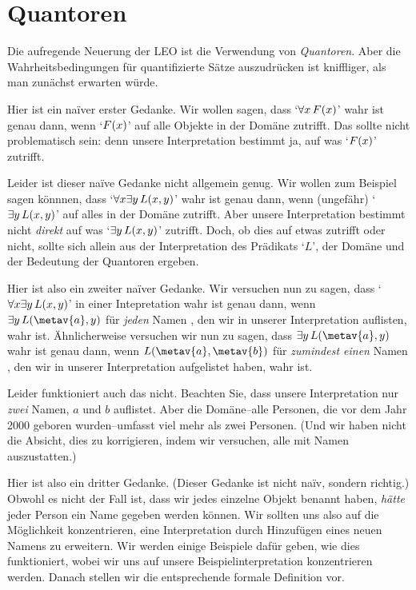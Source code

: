 \section{Quantoren}\label{s:MainLogicalOperatorQuantifier}
Die aufregende Neuerung der LEO ist die Verwendung von \emph{Quantoren}. Aber die Wahrheitsbedingungen für quantifizierte Sätze auszudrücken ist kniffliger, als man zunächst erwarten würde. 

Hier ist ein na\"{i}ver erster Gedanke. Wir wollen sagen, dass `$\forall x\, \mathord{F}(x)$' wahr ist genau dann, wenn `$\mathord{F}(x)$' auf alle Objekte in der Domäne zutrifft. Das sollte nicht problematisch sein: denn unsere Interpretation bestimmt ja, auf was `$\mathord{F}(x)$' zutrifft. 

Leider ist dieser na\"{i}ve Gedanke nicht allgemein genug. Wir wollen zum Beispiel sagen könnnen, dass `$\forall x \exists y\, \mathord{L}(x,y)$' wahr ist genau dann, wenn (ungefähr) `$\exists y\, \mathord{L}(x,y)$' auf alles in der Domäne zutrifft. Aber unsere Interpretation bestimmt nicht \emph{direkt} auf was `$\exists y\, \mathord{L}(x,y)$' zutrifft. Doch, ob dies auf etwas zutrifft oder nicht, sollte sich allein aus der Interpretation des Prädikats `$L$', der Domäne und der Bedeutung der Quantoren ergeben.

Hier ist also ein zweiter na\"{i}ver Gedanke. Wir versuchen nun zu sagen, dass `$\forall x \exists y\, \mathord{L}(x,y)$' in einer Intepretation wahr ist genau dann, wenn $\exists y\, \atom{L}{\metav{a},y}$ für \emph{jeden} Namen , den wir in unserer Interpretation auflisten, wahr ist. Ähnlicherweise versuchen wir nun zu sagen, dass $\exists y\, \atom{L}{\metav{a},y}$ wahr ist genau dann, wenn $\atom{L}{\metav{a},\metav{b}}$ für \emph{zumindest einen} Namen , den wir in unserer Interpretation aufgelistet haben, wahr ist.

Leider funktioniert auch das nicht. Beachten Sie, dass unsere Interpretation nur \emph{zwei} Namen, $a$ und $b$ auflistet. Aber die Domäne--alle Personen, die vor dem Jahr 2000 geboren wurden--umfasst viel mehr als zwei Personen. (Und wir haben nicht die Absicht, dies zu korrigieren, indem wir versuchen, alle mit Namen auszustatten.)

Hier ist also ein dritter Gedanke. (Dieser Gedanke ist nicht na\"{i}v, sondern richtig.) Obwohl es nicht der Fall ist, dass wir jedes einzelne Objekt benannt haben, \emph{hätte} jeder Person ein Name gegeben werden können. Wir sollten uns also auf die Möglichkeit konzentrieren, eine Interpretation durch Hinzufügen eines neuen Namens zu erweitern. Wir werden einige Beispiele dafür geben, wie dies funktioniert, wobei wir uns auf unsere Beispielinterpretation konzentrieren werden. Danach stellen wir die entsprechende formale Definition vor. 

